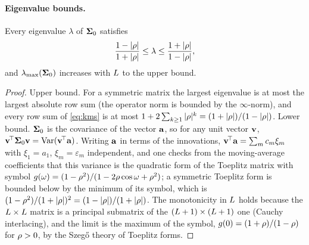 \paragraph{Eigenvalue bounds.}
\begin{proposition}
\label{prop:kms-spectrum}
Every eigenvalue $\lambda$ of $\mathbf{\Sigma}_0$ satisfies
\begin{equation}
  \frac{1-|\rho|}{1+|\rho|}\le\lambda\le\frac{1+|\rho|}{1-|\rho|},
  \label{eq:kms-bounds}
\end{equation}
and $\lambda_{\max}(\mathbf{\Sigma}_0)$ increases with $L$ to the upper bound.
\end{proposition}
\begin{proof}
Upper bound. For a symmetric matrix the largest eigenvalue is at most the largest
absolute row sum (the operator norm is bounded by the $\infty$-norm), and every row sum
of \cref{eq:kms} is at most $1+2\sum_{k\ge1}|\rho|^k=(1+|\rho|)/(1-|\rho|)$. Lower
bound. $\mathbf{\Sigma}_0$ is the covariance of the vector $\mathbf{a}$, so for any unit vector $\mathbf{v}$,
$\mathbf{v}^{\!\top}\mathbf{\Sigma}_0\mathbf{v}=\operatorname{Var}(\mathbf{v}^{\!\top}\mathbf{a})$. Writing $\mathbf{a}$ in terms of the
innovations, $\mathbf{v}^{\!\top}\mathbf{a}=\sum_mc_m\xi_m$ with $\xi_1=a_1$, $\xi_m=\varepsilon_m$
independent, and one checks from the moving-average coefficients that this variance
is the quadratic form of the Toeplitz matrix with symbol $g(\omega)=(1-\rho^2)/(1-2\rho\cos\omega+\rho^2)$;
a symmetric Toeplitz form is bounded below by the minimum of its symbol, which is
$(1-\rho^2)/(1+|\rho|)^2=(1-|\rho|)/(1+|\rho|)$. The monotonicity in $L$ holds
because the $L\times L$ matrix is a principal submatrix of the
$(L+1)\times(L+1)$ one (Cauchy interlacing), and the limit is the maximum of
the symbol, $g(0)=(1+\rho)/(1-\rho)$ for $\rho>0$, by the Szeg\H{o} theory of Toeplitz
forms.
\end{proof}

